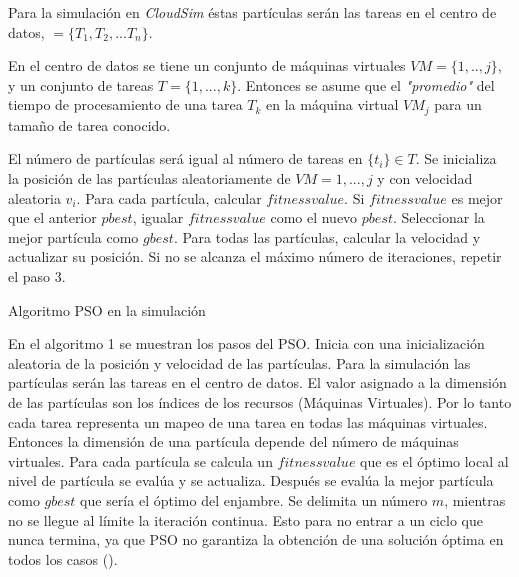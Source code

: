 Para la simulación en \textit{CloudSim} éstas partículas serán las tareas en el centro de datos, $ = \{T_1 , T_2 , ... T_n\}  $.


En el centro de datos se tiene un conjunto de máquinas virtuales $VM = \{1,..,j\}$, y un conjunto de tareas $T = \{1,...,k\}$. Entonces se asume que el \textit{"promedio"} del tiempo de procesamiento de una tarea $T_k$ en la máquina virtual $VM_j$ para un tamaño de tarea conocido.\\




\begin{algorithm} 
	\begin{algorithmic}[1]
		\State El número de partículas será igual al número de tareas en $ \{ t_i \} \in T $.
		\State Se inicializa la posición de las partículas aleatoriamente de $VM = 1,...,j $ y con velocidad aleatoria $v_i$.
		\State Para cada partícula, calcular $fitness value$.
		\State Si $fitness value$ es mejor que el anterior $pbest$, igualar $fitness value$ como el nuevo $pbest$.
		\State Seleccionar la mejor partícula como $gbest$.
		\State Para todas las partículas, calcular la velocidad y actualizar su posición.
		\State Si no se alcanza el máximo número de iteraciones, repetir el paso 3.
		
	\end{algorithmic} 
	\caption{Algoritmo PSO en la simulación}
	\label{alg:PSO}
\end{algorithm}


En el algoritmo 1 se muestran los pasos del PSO. Inicia con una inicialización aleatoria de la posición y velocidad de las partículas. Para la simulación las partículas serán las tareas en el centro de datos.
El valor asignado a la dimensión de las partículas son los índices de los recursos (Máquinas Virtuales). Por lo tanto cada tarea representa un mapeo de una tarea en todas las máquinas virtuales. Entonces la dimensión de una partícula depende del número de máquinas virtuales.
Para cada partícula se calcula un $fitnessvalue$ que es el óptimo local al nivel de partícula se evalúa y se actualiza. 
Después se evalúa la mejor partícula como $gbest$ que sería el óptimo del enjambre.
Se delimita un número $m$, mientras no se llegue al límite la iteración continua. Esto para no entrar a un ciclo que nunca termina, ya que PSO  no garantiza la obtención de una solución óptima en todos los casos (\cite{osman2012}).

